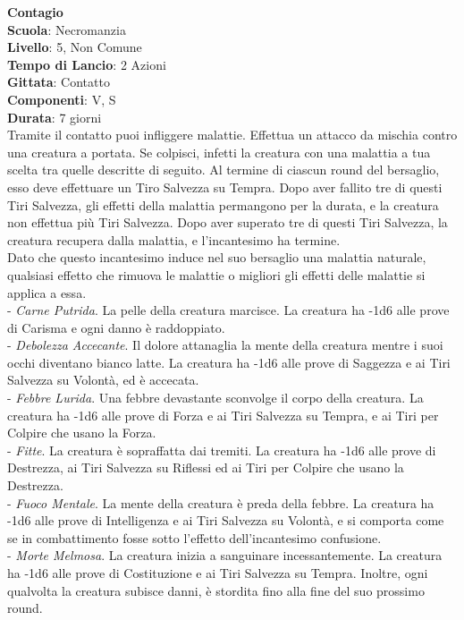 \begin{multicols}{2}
\medskip\textbf{Contagio}\\
\textbf{Scuola}: Necromanzia\\
\textbf{Livello}: 5, Non Comune\\
\textbf{Tempo di Lancio}: 2 Azioni\\
\textbf{Gittata}: Contatto\\
\textbf{Componenti}: V, S\\
\textbf{Durata}: 7 giorni\\
Tramite il contatto puoi infliggere malattie. Effettua un attacco da mischia contro una creatura a portata. Se colpisci, infetti la creatura con una malattia a tua scelta tra quelle descritte di seguito. Al termine di ciascun round del bersaglio, esso deve effettuare un Tiro Salvezza su Tempra. Dopo aver fallito tre di questi Tiri Salvezza, gli effetti della malattia permangono per la durata, e la creatura non effettua più Tiri Salvezza. Dopo aver superato tre di questi Tiri Salvezza, la creatura recupera dalla malattia, e l'incantesimo ha termine. \\
Dato che questo incantesimo induce nel suo bersaglio una malattia naturale, qualsiasi effetto che rimuova le malattie o migliori gli effetti delle malattie si applica a essa.\\
- \textit{Carne Putrida}. La pelle della creatura marcisce. La creatura ha -1d6 alle prove di Carisma e ogni danno è raddoppiato.\\
- \textit{Debolezza Accecante}. Il dolore attanaglia la mente della creatura mentre i suoi occhi diventano bianco latte. La creatura ha -1d6 alle prove di Saggezza e ai Tiri Salvezza su Volontà, ed è accecata.\\
- \textit{Febbre Lurida}. Una febbre devastante sconvolge il corpo della creatura. La creatura ha -1d6 alle prove di Forza e ai Tiri Salvezza su Tempra, e ai Tiri per Colpire che usano la Forza.\\
- \textit{Fitte}. La creatura è sopraffatta dai tremiti. La creatura ha -1d6 alle prove di Destrezza, ai Tiri Salvezza su Riflessi ed ai Tiri per Colpire che usano la Destrezza.\\
- \textit{Fuoco Mentale}. La mente della creatura è preda della febbre. La creatura ha -1d6 alle prove di Intelligenza e ai Tiri Salvezza su Volontà, e si comporta come se in combattimento fosse sotto l'effetto dell'incantesimo confusione.\\
- \textit{Morte Melmosa}. La creatura inizia a sanguinare incessantemente. La creatura ha -1d6 alle prove di Costituzione e ai Tiri Salvezza su Tempra. Inoltre, ogni qualvolta la creatura subisce danni, è stordita fino alla fine del suo prossimo round.\\



\end{multicols}
